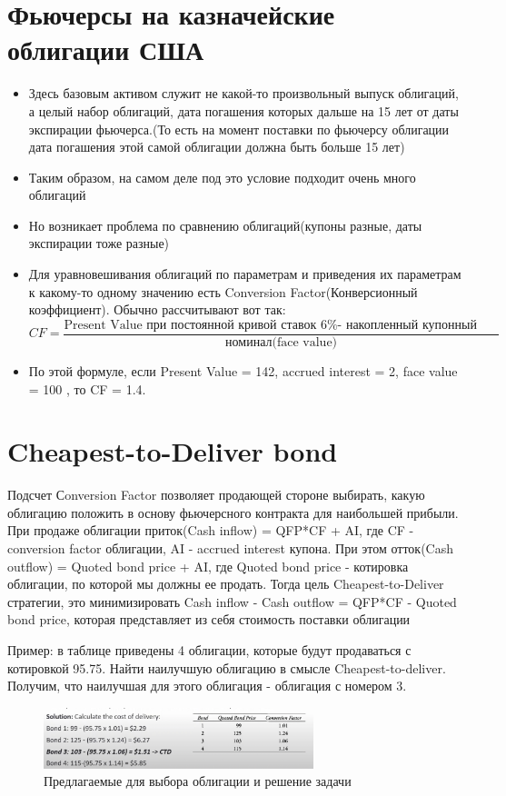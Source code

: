 \documentclass{article}
\begin{document}
\section{Фьючерсы на казначейские облигации США}
\begin{itemize}
    \item Здесь базовым активом служит не какой-то произвольный выпуск облигаций, а целый набор облигаций, дата погашения которых дальше на 15 лет от даты экспирации фьючерса.(То есть на момент поставки по фьючерсу облигации дата погашения этой самой облигации должна быть больше 15 лет)
    \item Таким образом, на самом деле под это условие подходит очень много облигаций
    \item Но возникает проблема по сравнению облигаций(купоны разные, даты экспирации тоже разные)
    \item Для уравновешивания облигаций по параметрам и приведения их параметрам к какому-то одному значению есть Conversion Factor(Конверсионный коэффициент). Обычно рассчитывают вот так:
    $$CF = \frac{\text{Present Value при постоянной кривой ставок 6\% - накопленный купонный доход}}{\text{номинал(face value)}}$$
    \item По этой формуле, если Present Value = 142, accrued interest = 2, face value = 100 , то CF = 1.4.
\end{itemize}

\section{Cheapest-to-Deliver bond}
Подсчет Сonversion Factor позволяет продающей стороне выбирать, какую облигацию положить в основу фьючерсного контракта для наибольшей прибыли.
При продаже облигации приток(Cash inflow) = QFP*CF + AI, где CF - conversion factor облигации, AI - accrued interest купона.
При этом отток(Cash outflow) = Quoted bond price + AI, где Quoted bond price - котировка облигации, по которой мы должны ее продать.
Тогда цель Cheapest-to-Deliver стратегии, это минимизировать Cash inflow - Cash outflow = QFP*CF - Quoted bond price, которая представляет из себя стоимость поставки облигации

Пример: в таблице приведены 4 облигации, которые будут продаваться с котировкой 95.75.
Найти наилучшую облигацию в смысле Cheapest-to-deliver. Получим, что наилучшая для этого облигация - облигация с номером 3.


\begin{figure}[h]
\centering
\includegraphics[width=0.7\textwidth]{cheap_to_del.png}
\caption{Предлагаемые для выбора облигации и решение задачи}
\label{loadings}
\end{figure}
\end{document}
